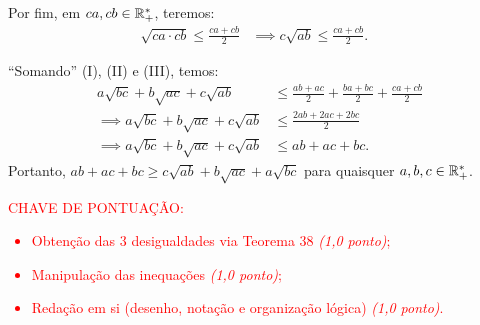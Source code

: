 Por fim, em $ca, cb \in \mathbb R_+^\ast$, teremos:
\begin{align*}
  \sqrt{ca\cdot cb} \leq \frac{ca+cb}{2} & \implies c\sqrt{ab} \leq \frac{ca+cb}{2}. & \tag{III}
\end{align*}

``Somando'' (I), (II) e (III), temos:
\begin{align*}
  a\sqrt{bc} + b\sqrt{ac} + c\sqrt{ab}          & \leq \frac{ab+ac}{2} + \frac{ba+bc}{2} + \frac{ca+cb}{2} \\
  \implies a\sqrt{bc} + b\sqrt{ac} + c\sqrt{ab} & \leq \frac{2ab+2ac+2bc}{2}                               \\
  \implies a\sqrt{bc} + b\sqrt{ac} + c\sqrt{ab} & \leq  ab + ac + bc.
\end{align*}
Portanto, $ ab + ac + bc \geq c\sqrt{ab} + b\sqrt{ac} + a\sqrt{bc}$ para quaisquer $a, b, c \in \mathbb R_+^\ast$.




\bigskip

\textcolor{red}{CHAVE DE PONTUAÇÃO:
  \begin{itemize}
    \item  Obtenção das 3 desigualdades via Teorema 38 \emph{(1,0 ponto)};
    \item Manipulação das inequações \emph{(1,0 ponto)};
    \item  Redação em si (desenho, notação e organização lógica) \emph{(1,0 ponto)}.
  \end{itemize} }